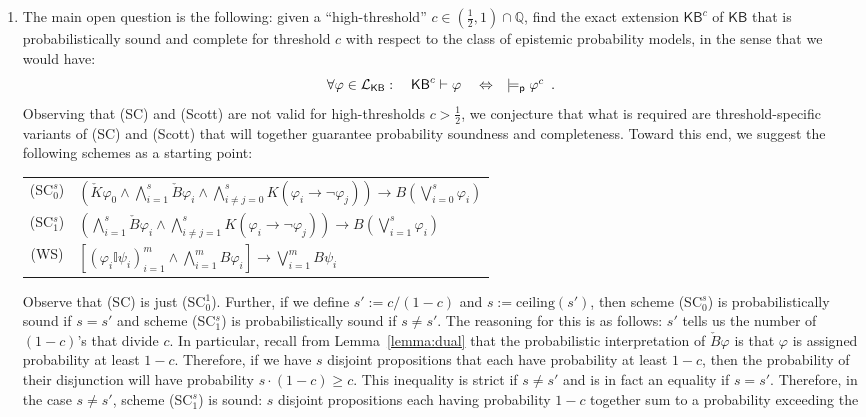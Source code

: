 \documentclass[12pt]{article}
\theoremstyle{definition}
\newcommand{\Rat}{\mathbb{Q}}  %
\newcommand{\Lang}{{\cal L}}   %
\newcommand{\KB}{{\mathsf{KB}}}                 %
\newcommand{\modelsp}{\models_{\mathsf{p}}}                  %
\begin{document}
\begin{enumerate}
\item The main open question is the following: given a
  ``high-threshold'' $c\in(\frac 12,1)\cap\Rat$, find the exact
  extension $\KB^c$ of $\KB$ that is probabilistically sound and
  complete for threshold $c$ with respect to the class of epistemic
  probability models, in the sense that we would have:
  \[
  \textstyle \forall\varphi\in\Lang_\KB:\quad \KB^c\vdash\varphi
  \quad\Leftrightarrow\quad \modelsp\varphi^c\enspace.
  \]
  Observing that (SC) and (Scott) are not valid for high-thresholds
  $c>\frac 12$, we conjecture that what is required are
  threshold-specific variants of (SC) and (Scott) that will together
  guarantee probability soundness and completeness.  Toward this end,
  we suggest the following schemes as a starting point:
\begin{center}
  \renewcommand{\arraystretch}{1.3}
  \begin{tabular}[t]{cl}
    (SC$_0^s$) &
    $\textstyle(\check K\varphi_0\land
    \bigwedge_{i=1}^s\check B\varphi_i\land
    \bigwedge_{i\neq j=0}^s K(\varphi_i\to\lnot \varphi_j))\to 
    B(\bigvee_{i=0}^s \varphi_i)$
    \\
    (SC$_1^s$) &
    $\textstyle(\bigwedge_{i=1}^s\check B\varphi_i\land
    \bigwedge_{i\neq j=1}^s K(\varphi_i\to\lnot \varphi_j))
    \to B(\bigvee_{i=1}^s \varphi_i)$
    \\
    (WS) &
    $\textstyle [(\varphi_i\mathbb{I}\psi_i)_{i=1}^m
    \land \bigwedge_{i=1}^m B\varphi_i] \to
    \bigvee_{i=1}^m B\psi_i$
  \end{tabular}
\end{center}
Observe that (SC) is just (SC$_0^1$).  Further, if we define
$s':=c/(1-c)$ and $s:=\text{ceiling}(s')$, then scheme (SC$_0^s$) is
probabilistically sound if $s=s'$ and scheme (SC$_1^s$) is
probabilistically sound if $s\neq s'$.  The reasoning for this is as
follows: $s'$ tells us the number of $(1-c)$'s that divide $c$.  In
particular, recall from Lemma~\ref{lemma:dual} that the probabilistic
interpretation of $\check B\varphi$ is that $\varphi$ is assigned
probability at least $1-c$.  Therefore, if we have $s$ disjoint
propositions that each have probability at least $1-c$, then the
probability of their disjunction will have probability
$s\cdot(1-c)\geq c$.  This inequality is strict if $s\neq s'$ and is
in fact an equality if $s=s'$.  Therefore, in the case $s\neq s'$,
scheme (SC$_1^s$) is sound: $s$ disjoint propositions each having
probability $1-c$ together sum to a probability exceeding the

\end{enumerate}
\end{document}
